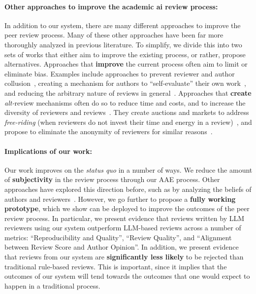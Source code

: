 \documentclass{article} %
\begin{document}
\paragraph{Other approaches to improve the academic ai review process:}
In addition to our system, there are many different approaches to improve the peer review process. Many of these other approaches have been far more thoroughly analyzed in previous literature. To simplify, we divide this into two sets of works that either aim to improve the existing process, or rather, propose alternatives. Approaches that \textbf{improve} the current process often aim to limit or eliminate bias. Examples include approaches to prevent reviewer and author collusion~\citep{wu2021making, wu2024truth, jecmen2024detection}, creating a mechanism for authors to ``self-evaluate'' their own work~\citep{su2021you, wu2023isotonic, su2024analysis}, and reducing the arbitrary nature of reviews in general~\citep{shah2022challenges}. Approaches that \textbf{create} \textit{alt-}review mechanisms often do so to reduce time and costs, and to increase the diversity of reviewers and reviews~\citep{stelmakh2021novice}. They create auctions and markets to address \textit{free-riding} (when reviewers do not invest their time and energy in a review)~\citep{frijters2019improving, srinivasan2021auctions, ugarov2023peer}, and propose to eliminate the anonymity of reviewers for similar reasons~\citep{sculley2018avoiding}.
\paragraph{Implications of our work:}
Our work improves on the \textit{status quo} in a number of ways. We reduce the amount of \textbf{subjectivity} in the review process through our AAE process. Other approaches have explored this direction before, such as by analyzing the beliefs of authors and reviewers~\citep{su2021you, su2024analysis, wu2024truth}. However, we go further to propose a \textbf{fully working prototype}, which we show can be deployed to improve the outcomes of the peer review process. In particular, we present evidence that reviews written by LLM reviewers using our system outperform LLM-based reviews across a number of metrics: ``Reproducibility and Quality'', ``Review Quality'', and ``Alignment between Review Score and Author Opinion''. In addition, we present evidence that reviews from our system are \textbf{significantly less likely} to be rejected than traditional rule-based reviews. This is important, since it implies that the outcomes of our system will tend towards the outcomes that one would expect to happen in a traditional process. 
\end{document}
